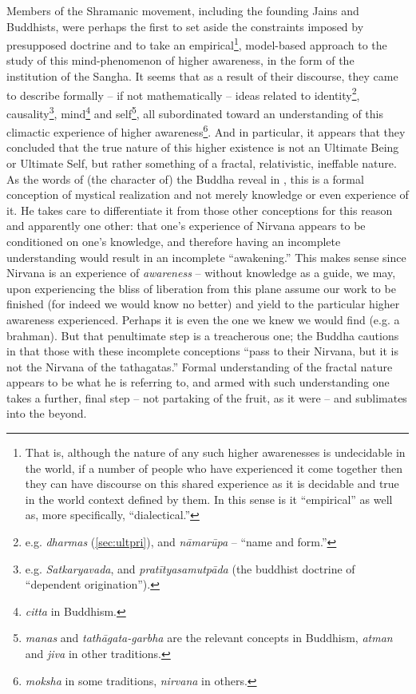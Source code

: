 \documentclass[pra,twocolumn,groupedaddress,10pt]{revtex4}
\theoremstyle{definition}
\begin{document}
Members of the Shramanic movement, including the founding Jains and Buddhists, were perhaps the first to set aside the constraints imposed by presupposed doctrine and to take an empirical\footnote{That is, although the nature of any such higher awarenesses is undecidable in the world, if a number of people who have experienced it come together then they can have discourse on this shared experience as it is decidable and true in the world context defined by them. In this sense is it ``empirical'' as well as, more specifically, ``dialectical.''}, model-based approach to the study of this mind-phenomenon of higher awareness, in the form of the institution of the Sangha. It seems that as a result of their discourse, they came to describe formally -- if not mathematically -- ideas related to identity\footnote{e.g. \textit{dharmas} (\autoref{sec:ultpri}), and \textit{n\={a}mar\={u}pa} -- ``name and form.''}, causality\footnote{e.g. \textit{Satkaryavada}, and \textit{prat\={i}tyasamutp\={a}da} (the buddhist doctrine of ``dependent origination'').}, mind\footnote{\textit{citta} in Buddhism.} and self\footnote{\textit{manas} and \textit{tath\={a}gata-garbha} are the relevant concepts in Buddhism, \textit{atman} and \textit{jiva} in other traditions.}, all subordinated toward an understanding of this climactic experience of higher awareness\footnote{\textit{moksha} in some traditions, \textit{nirvana} in others.}. And in particular, it appears that they concluded that the true nature of this higher existence is not an Ultimate Being or Ultimate Self, but rather something of a fractal, relativistic, ineffable nature. As the words of (the character of) the Buddha reveal in \cite{lankavatara}, this is a formal conception of mystical realization and not merely knowledge or even experience of it. He takes care to differentiate it from those other conceptions for this reason and apparently one other: that one's experience of Nirvana appears to be conditioned on one's knowledge, and therefore having an incomplete understanding would result in an incomplete ``awakening.'' This makes sense since Nirvana is an experience of \textit{awareness} -- without knowledge as a guide, we may, upon experiencing the bliss of liberation from this plane assume our work to be finished (for indeed we would know no better) and yield to the particular higher awareness experienced. Perhaps it is even the one we knew we would find (e.g. a brahman). But that penultimate step is a treacherous one; the Buddha cautions in \cite{lankavatara} that those with these incomplete conceptions ``pass to their Nirvana, but it is not the Nirvana of the tathagatas.'' Formal understanding of the fractal nature appears to be what he is referring to, and armed with such understanding one takes a further, final step -- not partaking of the fruit, as it were -- and sublimates into the beyond.
\end{document}
